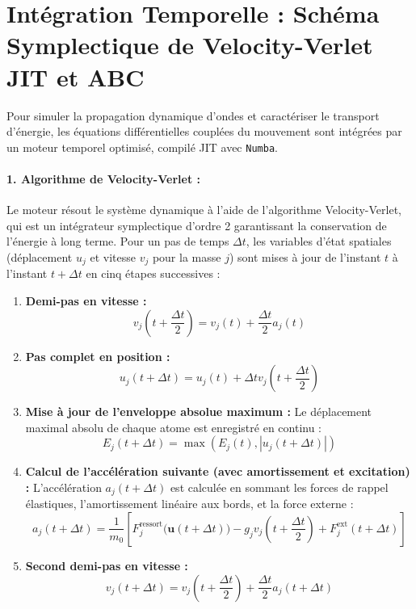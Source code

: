 \section{Intégration Temporelle : Schéma Symplectique de Velocity-Verlet JIT et ABC}

Pour simuler la propagation dynamique d'ondes et caractériser le transport d'énergie, les équations différentielles couplées du mouvement sont intégrées par un moteur temporel optimisé, compilé JIT avec \texttt{Numba}. 

\paragraph{1. Algorithme de Velocity-Verlet :}
Le moteur résout le système dynamique à l'aide de l'algorithme Velocity-Verlet, qui est un intégrateur symplectique d'ordre 2 garantissant la conservation de l'énergie à long terme. Pour un pas de temps $\Delta t$, les variables d'état spatiales (déplacement $u_j$ et vitesse $v_j$ pour la masse $j$) sont mises à jour de l'instant $t$ à l'instant $t + \Delta t$ en cinq étapes successives :
\begin{enumerate}
    \item \textbf{Demi-pas en vitesse :}
    \begin{equation}
        v_j\left(t + \frac{\Delta t}{2}\right) = v_j(t) + \frac{\Delta t}{2} a_j(t)
    \end{equation}
    \item \textbf{Pas complet en position :}
    \begin{equation}
        u_j(t + \Delta t) = u_j(t) + \Delta t v_j\left(t + \frac{\Delta t}{2}\right)
    \end{equation}
    \item \textbf{Mise à jour de l'enveloppe absolue maximum :}
    Le déplacement maximal absolu de chaque atome est enregistré en continu :
    \begin{equation}
        E_j(t + \Delta t) = \max\left( E_j(t), |u_j(t + \Delta t)| \right)
    \end{equation}
    \item \textbf{Calcul de l'accélération suivante (avec amortissement et excitation) :}
    L'accélération $a_j(t + \Delta t)$ est calculée en sommant les forces de rappel élastiques, l'amortissement linéaire aux bords, et la force externe :
    \begin{equation}
        a_j(t + \Delta t) = \frac{1}{m_0} \left[ F_j^{\text{ressort}}\big(\mathbf{u}(t + \Delta t)\big) - g_j v_j\left(t + \frac{\Delta t}{2}\right) + F_j^{\text{ext}}(t + \Delta t) \right]
    \end{equation}
    \item \textbf{Second demi-pas en vitesse :}
    \begin{equation}
        v_j(t + \Delta t) = v_j\left(t + \frac{\Delta t}{2}\right) + \frac{\Delta t}{2} a_j(t + \Delta t)
    \end{equation}
\end{enumerate}
